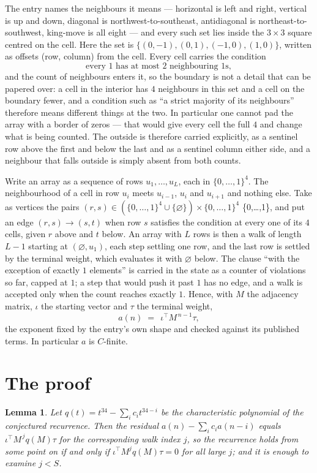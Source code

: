 \documentclass[11pt,a4paper]{article}
\theoremstyle{plain}
\newtheorem{lemma}[theorem]{Lemma}
\theoremstyle{definition}
\begin{document}
The entry names the neighbours it means --- horizontal is left and right, vertical is up and
down, diagonal is northwest-to-southeast, antidiagonal is northeast-to-southwest, king-move is
all eight --- and every such set lies inside the $3\times3$ square centred on the cell. Here
the set is $\{(0,-1), (0,1), (-1,0), (1,0)\}$, written as offsets (row, column) from the cell. Every cell carries
the condition
\[
\text{every 1 has at most 2 neighbouring 1s},
\]
and the count of neighbours enters it, so the boundary is not a detail that can be papered
over: a cell in the interior has $4$ neighbours in this set and a cell on the boundary
fewer, and a condition such as ``a strict majority of its neighbours'' therefore means
different things at the two. In particular one cannot pad the array with a border of zeros ---
that would give every cell the full $4$ and change what is being counted. The outside is
therefore carried
explicitly, as a sentinel row above the first and below the last and as a sentinel column
either side, and a neighbour that falls outside is simply absent from both counts.

Write an array as a sequence of rows $u_1,\dots,u_L$, each in
$\{0,\dots,1\}^{4}$. The neighbourhood of a cell in row $u_i$ meets $u_{i-1}$,
$u_i$ and $u_{i+1}$ and nothing else. Take as vertices the pairs
$(r,s)\in(\{0,\dots,1\}^{4}\cup\{\varnothing\})\times\{0,\dots,1\}^{4}$ \times \{0,\dots,1\},
and put an edge $(r,s)\to(s,t)$ when row $s$ satisfies the condition at every one of its
$4$ cells, given $r$ above and $t$ below. An array with $L$ rows is then a walk of length
$L-1$ starting at $(\varnothing,u_1)$, each step settling one row, and the last row is
settled by the terminal weight, which evaluates it with $\varnothing$ below. The clause ``with the exception of exactly $1$ elements'' is carried in
the state as a counter of violations so far, capped at $1$; a step that would push it past
$1$ has no edge, and a walk is accepted only when the count reaches exactly $1$. Hence,
with $M$ the adjacency matrix, $\iota$ the starting vector and $\tau$ the terminal weight,
\[
a(n)\;=\;\,\iota^{\!\top}M^{\,n-1}\tau ,
\]
the exponent fixed by the entry's own shape and checked against its published terms. In
particular $a$ is $C$-finite.

\section{The proof}

\begin{lemma}\label{lem:crit}
Let $q(t)=t^{34}-\sum_i c_it^{34-i}$ be the characteristic polynomial of the
conjectured recurrence. Then the residual $a(n)-\sum_ic_ia(n-i)$ equals
$\iota^{\!\top}M^{\,j}q(M)\tau$ for the corresponding walk index $j$, so the
recurrence holds from some point on if and only if $\iota^{\!\top}M^{j}q(M)\tau=0$ for all
large $j$; and it is enough to examine $j<S$.
\end{lemma}
\end{document}
